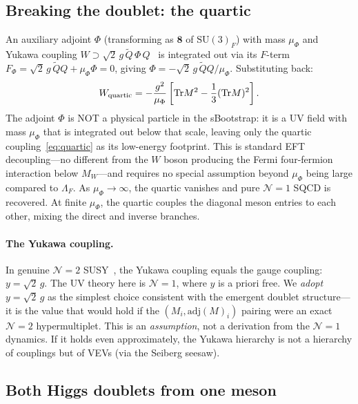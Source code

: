 \documentclass[aps,prd,twocolumn,showpacs,preprintnumbers,superscriptaddress,floatfix]{revtex4-2}
\newcommand{\SU}{\mathrm{SU}}
\newcommand{\Tr}{\mathrm{Tr}}
\newcommand{\adj}{\mathrm{adj}}
\begin{document}
\subsection{Breaking the doublet: the quartic}

An auxiliary adjoint $\Phi$ (transforming as $\mathbf{8}$ of
$\SU(3)_F$) with mass $\mu_\Phi$ and Yukawa coupling
$W \supset \sqrt{2}\,g\,\tilde{Q}\,\Phi\,Q$~\cite{HMS:1997}
is integrated out via its $F$-term
$F_\Phi = \sqrt{2}\,g\,\tilde{Q}Q + \mu_\Phi\Phi = 0$,
giving $\Phi = -\sqrt{2}\,g\,\tilde{Q}Q/\mu_\Phi$.
Substituting back:
\begin{equation}
  W_{\rm quartic} = -\frac{g^2}{\mu_\Phi}
    \left[\Tr M^2
    - \frac{1}{3}(\Tr M)^2\right].
  \label{eq:quartic}
\end{equation}
The adjoint $\Phi$ is NOT a physical particle in the sBootstrap:
it is a UV field with mass $\mu_\Phi$ that is integrated out
below that scale, leaving only the quartic
coupling~\eqref{eq:quartic} as its low-energy footprint.
This is standard EFT decoupling---no different from the $W$
boson producing the Fermi four-fermion interaction below
$M_W$---and requires no special assumption beyond $\mu_\Phi$
being large compared to $\Lambda_F$.
As $\mu_\Phi \to \infty$, the quartic vanishes and pure
$\mathcal{N}{=}1$ SQCD is recovered.
At finite $\mu_\Phi$, the quartic couples the diagonal meson
entries to each other, mixing the direct and inverse branches.

\paragraph{The Yukawa coupling.}
In genuine $\mathcal{N}{=}2$
SUSY~\cite{Fayet:1976,SeibergWitten:1994},
the Yukawa coupling equals the gauge coupling:
$y = \sqrt{2}\,g$.
The UV theory here is $\mathcal{N}{=}1$, where $y$ is a priori
free.
We \emph{adopt} $y = \sqrt{2}\,g$ as the simplest choice
consistent with the emergent doublet structure---it is the value
that would hold if the $(M_i, \adj(M)_i)$ pairing were an exact
$\mathcal{N}{=}2$ hypermultiplet.
This is an \emph{assumption}, not a derivation from the
$\mathcal{N}{=}1$ dynamics.
If it holds even approximately, the Yukawa hierarchy is not a
hierarchy of couplings but of VEVs (via the Seiberg seesaw).


\subsection{Both Higgs doublets from one meson}
\end{document}
